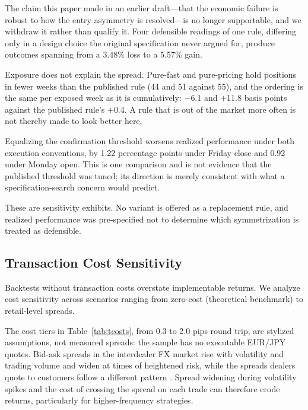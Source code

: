 \documentclass[11pt]{article}
\begin{document}
The claim this paper made in an earlier draft---that the economic failure is robust to how the entry asymmetry is resolved---is no longer supportable, and we withdraw it rather than qualify it. Four defensible readings of one rule, differing only in a design choice the original specification never argued for, produce outcomes spanning from a 3.48\% loss to a 5.57\% gain.

Exposure does not explain the spread. Pure-fast and pure-pricing hold positions in fewer weeks than the published rule (44 and 51 against 55), and the ordering is the same per exposed week as it is cumulatively: $-$6.1 and $+$11.8 basis points against the published rule's $+$0.4. A rule that is out of the market more often is not thereby made to look better here.

Equalizing the confirmation threshold worsens realized performance under both execution conventions, by 1.22 percentage points under Friday close and 0.92 under Monday open. This is one comparison and is not evidence that the published threshold was tuned; its direction is merely consistent with what a specification-search concern would predict.

These are sensitivity exhibits. No variant is offered as a replacement rule, and realized performance was pre-specified not to determine which symmetrization is treated as defensible.

\subsection{Transaction Cost Sensitivity}
\label{sec:tcosts}

Backtests without transaction costs overstate implementable returns. We analyze cost sensitivity across scenarios ranging from zero-cost (theoretical benchmark) to retail-level spreads.

The cost tiers in Table~\ref{tab:tcosts}, from 0.3 to 2.0 pips round trip, are stylized assumptions, not measured spreads: the sample has no executable EUR/JPY quotes. Bid-ask spreads in the interdealer FX market rise with volatility and trading volume and widen at times of heightened risk, while the spreads dealers quote to customers follow a different pattern \citep{king2013market}. Spread widening during volatility spikes and the cost of crossing the spread on each trade can therefore erode returns, particularly for higher-frequency strategies.
\end{document}
